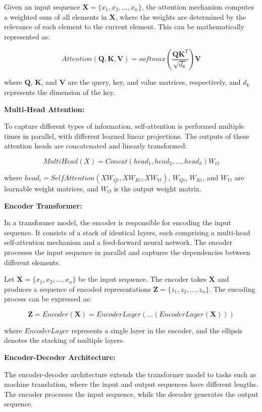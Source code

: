 \documentclass[a4paper,12pt]{article}
\begin{document}
Given an input sequence $\mathbf{X} = \{x_1, x_2, \ldots, x_n\}$, the attention mechanism computes a weighted sum of all elements in $\mathbf{X}$, where the weights are determined by the relevance of each element to the current element. This can be mathematically represented as:

$$Attention(\mathbf{Q}, \mathbf{K}, \mathbf{V}) = softmax\left(\frac{\mathbf{QK}^T}{\sqrt{d_k}}\right) \mathbf{V}$$

where $\mathbf{Q}$, $\mathbf{K}$, and $\mathbf{V}$ are the query, key, and value matrices, respectively, and $d_k$ represents the dimension of the key.

\textbf{Multi-Head Attention:}

To capture different types of information, self-attention is performed multiple times in parallel, with different learned linear projections. The outputs of these attention heads are concatenated and linearly transformed:

$$MultiHead(X) = Concat(head_1, head_2, ..., head_h)W_O$$

where $head_i = SelfAttention(XW_{Qi}, XW_{Ki}, XW_{Vi})$, $W_{Qi}$, $W_{Ki}$, and $W_{Vi}$ are learnable weight matrices, and $W_O$ is the output weight matrix.

\textbf{Encoder Transformer:}

In a transformer model, the encoder is responsible for encoding the input sequence. It consists of a stack of identical layers, each comprising a multi-head self-attention mechanism and a feed-forward neural network. The encoder processes the input sequence in parallel and captures the dependencies between different elements.

Let $\mathbf{X} = \{x_1, x_2, \ldots, x_n\}$ be the input sequence. The encoder takes $\mathbf{X}$ and produces a sequence of encoded representations $\mathbf{Z} = \{z_1, z_2, \ldots, z_n\}$. The encoding process can be expressed as:

$$\mathbf{Z} = Encoder(\mathbf{X}) = EncoderLayer(\ldots(EncoderLayer(\mathbf{X})))$$

where $EncoderLayer$ represents a single layer in the encoder, and the ellipsis denotes the stacking of multiple layers.

\textbf{Encoder-Decoder Architecture:}

The encoder-decoder architecture extends the transformer model to tasks such as machine translation, where the input and output sequences have different lengths. The encoder processes the input sequence, while the decoder generates the output sequence.
\end{document}
